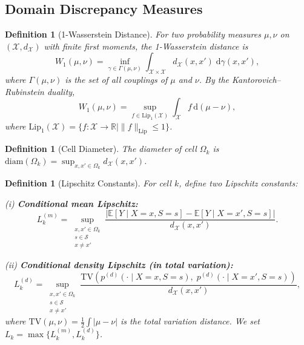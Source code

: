 \documentclass[12pt,a4paper]{article}
\newtheorem{definition}[theorem]{Definition}
\newcommand{\R}{\mathbb{R}}
\newcommand{\E}{\mathbb{E}}
\newcommand{\cX}{\mathcal{X}}
\newcommand{\cS}{\mathcal{S}}
\newcommand{\Wass}{W_1}
\newcommand{\Lip}{\mathrm{Lip}}
\newcommand{\diam}{\mathrm{diam}}
\newcommand{\TV}{\mathrm{TV}}
\begin{document}
\subsection{Domain Discrepancy Measures}

\begin{definition}[1-Wasserstein Distance]
\label{def:wasserstein}
For two probability measures $\mu,\nu$ on $(\cX,d_{\cX})$ with finite first
moments, the 1-Wasserstein distance is
\begin{equation}\label{eq:w1}
    \Wass(\mu,\nu) =
    \inf_{\gamma\in\Gamma(\mu,\nu)}
    \int_{\cX\times\cX} d_{\cX}(x,x')\;\mathrm{d}\gamma(x,x'),
\end{equation}
where $\Gamma(\mu,\nu)$ is the set of all couplings of $\mu$ and $\nu$.
By the Kantorovich--Rubinstein duality,
\begin{equation}\label{eq:w1-dual}
    \Wass(\mu,\nu) =
    \sup_{f\in\mathrm{Lip}_1(\cX)}
    \int_{\cX} f\,\mathrm{d}(\mu-\nu),
\end{equation}
where $\mathrm{Lip}_1(\cX)=\{f:\cX\to\R\mid \|f\|_{\Lip}\leq 1\}$.
\end{definition}

\begin{definition}[Cell Diameter]
\label{def:diam}
The diameter of cell $\Omega_k$ is
$\diam(\Omega_k)=\sup_{x,x'\in\Omega_k} d_{\cX}(x,x')$.
\end{definition}

\begin{definition}[Lipschitz Constants]
\label{def:lip}
For cell $k$, define two Lipschitz constants:

\noindent (i) \textbf{Conditional mean Lipschitz:}
\[
L_k^{(m)} = \sup_{\substack{x,x'\in\Omega_k\\ s\in\cS\\ x\neq x'}}
\frac{|\E[Y\mid X=x,S=s]-\E[Y\mid X=x',S=s]|}{d_{\cX}(x,x')}.
\]

\noindent (ii) \textbf{Conditional density Lipschitz (in total variation):}
\[
L_k^{(d)} = \sup_{\substack{x,x'\in\Omega_k\\ s\in\cS\\ x\neq x'}}
\frac{\TV(p^{(d)}(\cdot\mid X=x,S=s),\;p^{(d)}(\cdot\mid X=x',S=s))}{d_{\cX}(x,x')},
\]
where $\TV(\mu,\nu)=\frac12\int|\mu-\nu|$ is the total variation distance.
We set $L_k = \max\{L_k^{(m)}, L_k^{(d)}\}$.
\end{definition}
\end{document}
